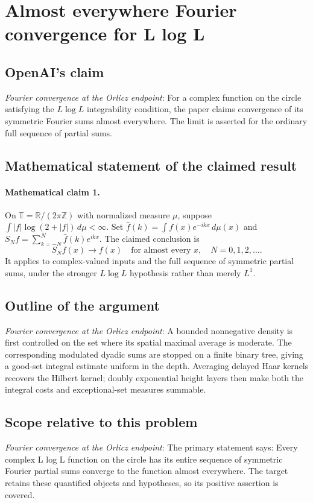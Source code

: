\documentclass[11pt]{article}
\begin{document}
\section*{Almost everywhere Fourier convergence for L log L}

\subsection{OpenAI's claim}
\textit{Fourier convergence at the Orlicz endpoint}: For a complex function on the circle satisfying the $L\log L$ integrability condition, the paper claims convergence of its symmetric Fourier sums almost everywhere. The limit is asserted for the ordinary full sequence of partial sums.

\subsection{Mathematical statement of the claimed result}
\paragraph{Mathematical claim 1.} On $\mathbb T=\mathbb R/(2\pi\mathbb Z)$ with normalized measure $\mu$, suppose $\int|f|\log(2+|f|)\,d\mu<\infty$. Set $\widehat f(k)=\int f(x)e^{-ikx}\,d\mu(x)$ and $S_Nf=\sum_{k=-N}^N\widehat f(k)e^{ikx}$. The claimed conclusion is \[S_Nf(x)\longrightarrow f(x)\quad\text{for almost every }x,\quad N=0,1,2,\ldots.\] It applies to complex-valued inputs and the full sequence of symmetric partial sums, under the stronger $L\log L$ hypothesis rather than merely $L^1$.

\subsection{Outline of the argument}
\textit{Fourier convergence at the Orlicz endpoint}: A bounded nonnegative density is first controlled on the set where its spatial maximal average is moderate. The corresponding modulated dyadic sums are stopped on a finite binary tree, giving a good-set integral estimate uniform in the depth. Averaging delayed Haar kernels recovers the Hilbert kernel; doubly exponential height layers then make both the integral costs and exceptional-set measures summable.

\subsection{Scope relative to this problem}
\textit{Fourier convergence at the Orlicz endpoint}: The primary statement says: Every complex L log L function on the circle has its entire sequence of symmetric Fourier partial sums converge to the function almost everywhere. The target retains these quantified objects and hypotheses, so its positive assertion is covered.
\end{document}
